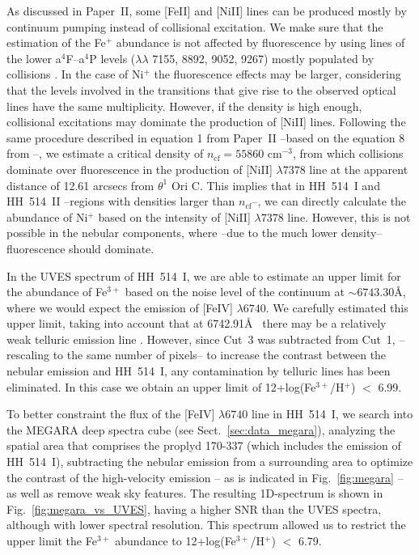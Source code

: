 \documentclass[fleqn,usenatbib]{mnras}
\begin{document}
As discussed in Paper~II, some [Fe\thinspace II] and [Ni\thinspace II] lines can be produced mostly by continuum pumping instead of collisional excitation. We make sure that the estimation of the Fe$^+$ abundance is not affected by fluorescence by using lines of the lower  a$^4$F--a$^4$P levels  ($\lambda \lambda$ 7155, 8892, 9052, 9267) mostly populated by collisions \citep{Baldwin96}. In the case of Ni$^+$ the fluorescence effects may be larger, considering that the  levels involved in the transitions that give rise to the observed optical lines have the same multiplicity. However, if the density is high enough, collisional excitations may dominate the production of [Ni\thinspace II] lines. Following the same procedure described in equation 1 from Paper~II --based on the equation 8 from \citet{Bautista96}--, we estimate a critical density of $n_{\text{cf}}= 55860 \text{ cm}^{-3}$, from which collisions dominate over  fluorescence in the production of [Ni\thinspace II] $\lambda 7378$ line at the apparent distance of 12.61 arcsecs from $\theta^1$ Ori C. This implies that in HH~514~I and HH~514~II --regions with densities larger than $n_{\text{cf}}$--, we can directly calculate the abundance of Ni$^{+}$ based on the intensity of [Ni\thinspace II] $\lambda 7378$ line. However, this is not possible in the nebular components, where --due to the much lower density-- fluorescence should dominate.

In the UVES spectrum of HH~514~I, we are able to estimate an upper limit for the abundance of Fe$^{3+}$ based on the noise level of the continuum at $\sim 6743.30$\AA, where we would expect the emission of [Fe\thinspace IV] $\lambda6740$. We carefully estimated this upper limit, taking into account that at 6742.91\AA~ there may be a relatively weak telluric emission line \citep[][]{Hanuschik03}. However, since Cut~3 was subtracted from Cut~1, --rescaling to the same number of pixels-- to increase the contrast between the nebular emission and HH~514~I, any contamination by telluric lines has been eliminated. In this case we obtain an upper limit of 12+log(Fe$^{3+}$/H$^+$) $<$ 6.99.

To better constraint the flux of the [Fe\thinspace IV] $\lambda6740$ line in HH~514~I, we search into the MEGARA deep spectra cube (see Sect.~\ref{sec:data_megara}), analyzing the spatial area that comprises the proplyd 170-337 (which includes the emission of HH~514~I), subtracting the nebular emission from a surrounding area to optimize the contrast of the high-velocity emission -- as is indicated in Fig.~\ref{fig:megara} -- as well as remove weak sky features. The resulting 1D-spectrum is shown in Fig.~\ref{fig:megara_vs_UVES}, having a higher SNR than the UVES spectra, although with lower spectral resolution. This spectrum allowed us to restrict the upper limit the Fe$^{3+}$ abundance to   12+log(Fe$^{3+}$/H$^+$) $<$ 6.79.
\end{document}
